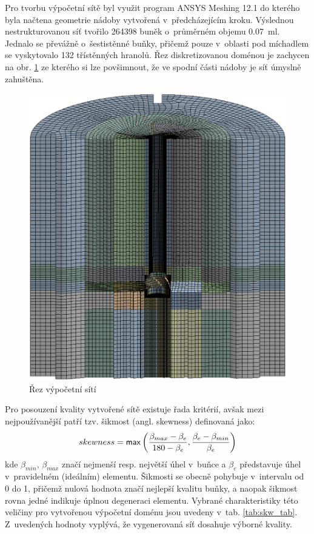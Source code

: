 Pro tvorbu výpočetní sítě byl využit program ANSYS Meshing 12.1 do kterého byla načtena geometrie nádoby vytvořená v~předcházejícím kroku. Výslednou nestrukturovanou síť tvořilo \num{264398} buněk o~průměrném objemu \SI{0.07}{\milli\litre}. Jednalo se převážně o~šestistěnné buňky, přičemž pouze v~oblasti pod míchadlem se vyskytovalo \num{132} třístěnných hranolů. Řez diskretizovanou doménou je zachycen na obr. \ref{fig:mesh} ze kterého si lze povšimnout, že ve spodní části nádoby je síť úmyslně zahuštěna. 
\begin{figure}[t]
\centering
\includegraphics[scale=0.28]{images/mesh.eps}
\caption{Řez výpočetní sítí}
\label{fig:mesh}
\end{figure} 
Pro posouzení kvality vytvořené sítě existuje řada kritérií, avšak mezi nejpoužívanější patří tzv. šikmost (angl. skewness) definovaná jako:
\begin{equation}
      skewness = \mathsf{max}\left( \frac{\beta_{max} - \beta_{e}}{180 - \beta_{e}}, \frac{\beta_{e} - \beta_{min}}{\beta_{e}} \right)
  	\label{eq:skw}
\end{equation} 
kde $\beta_{min}$, $\beta_{max}$ značí nejmenší resp. největší úhel v~buňce a $\beta_{e}$ představuje úhel v~pravidelném (ideálním) elementu. Šikmosti se obecně pohybuje v~intervalu od \num{0} do \num{1}, přičemž nulová hodnota značí nejlepší kvalitu buňky, a naopak šikmost rovna jedné indikuje úplnou degeneraci elementu. Vybrané charakteristiky této veličiny pro vytvořenou výpočetní doménu jsou uvedeny v~tab. \ref{tab:skw_tab}. Z~uvedených hodnoty vyplývá, že vygenerovaná síť dosahuje výborné kvality.

